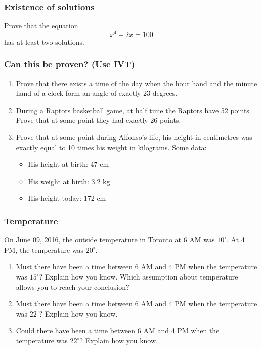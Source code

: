 \documentclass[14pt]{beamer}
\newcommand{\p}{\pause}
\newcommand{\setsize}[1]{\fontsize{#1}{#1}\selectfont} %
\newcommand{\smallerfont}{\setsize{13}} %
\begin{document}
\begin{frame}
\frametitle{Existence of solutions}

Prove that the equation 
	$$
		x^4 - 2x = 100
	$$
has at least two solutions.

\end{frame}
\begin{frame}[t]
\frametitle{Can this be proven? (Use IVT)}
\smallerfont
\begin{enumerate}
\item  Prove that there exists a time of the day when the hour hand and the minute hand of a clock form an angle of exactly 23 degrees.

\p \vfill
\item  During a Raptors basketball game, at half time the Raptors have 52 points.  Prove that at some point they had exactly 26 points.

\p \vfill
\item  Prove that at some point during Alfonso's life, his height in centimetres was exactly equal to 10 times his weight in kilograms.  Some data:
	\begin{itemize}
		\item  His height at birth: 47 cm
		\item  His weight at birth: 3.2 kg
		\item  His height today: 172 cm
	\end{itemize}
\vfill
\end{enumerate}

\end{frame}

\begin{frame}
\frametitle{Temperature}
	
	On June 09, 2016, the outside temperature in Toronto at 6 AM was $10^\circ$. At 4 PM,
the temperature was $20^\circ$. 

\begin{enumerate}


\item Must there have been a time between 6 AM and 4 PM when the temperature was $15^\circ$?
Explain how you know. Which assumption about temperature allows you to reach your conclusion?


\item Must there have been a time between 6 AM and 4 PM when the temperature was $22^\circ$?
Explain how you know.


\item Could there have been a time between 6 AM and 4 PM when the temperature was $22^\circ$?
Explain how you know.

\end{enumerate}
\end{frame}
\end{document}
